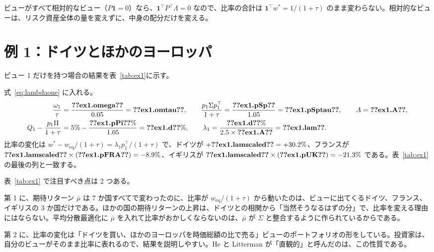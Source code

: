 \documentclass[xelatex,ja=standard,jafont=hiragino-pron,a4paper,11pt,openany]{bxjsreport}
\makeatletter
\newcommand{\V}[1]{\ifcsname v@#1\endcsname\csname v@#1\endcsname\else\textbf{??#1??}\fi}
\newcommand{\tabin}[1]{\adjustbox{max width=\linewidth}{}}
\newcommand{\T}{^{\top}}
\newcommand{\weq}{w_{\mathrm{eq}}}
\newcommand{\mub}{\bar{\mu}}
\newcommand{\one}{\mathbf{1}}
\newcommand{\tabref}[1]{表~\ref{#1}}
\makeatother
\begin{document}
ビューがすべて相対的なビュー（$P\one = 0$）なら、$\one\T P\T\Lambda = 0$ なので、比率の合計は $\one\T w^* = 1/(1 + \tau)$ のまま変わらない。相対的なビューは、リスク資産全体の量を変えずに、中身の配分だけを変える。

\section{例 1：ドイツとほかのヨーロッパ}

ビュー 1 だけを持つ場合の結果を\tabref{tab:ex1}に示す。

\begin{table}[htbp]
\centering
\caption{例 1：ドイツがほかのヨーロッパを 5\% 上回る（年率 \%、$\tau = 0.05$、$\delta = 2.5$）。}
\label{tab:ex1}
\small\tabin{ex1}
\end{table}

\begin{exbox}
式~\eqref{eq:lambdaone} に入れる。
\begin{align*}
\frac{\omega_1}{\tau} &= \frac{\V{ex1.omega}}{0.05} = \V{ex1.omtau}, \qquad
\frac{p_1\Sigma p_1\T}{1 + \tau} = \frac{\V{ex1.pSp}}{1.05} = \V{ex1.pSptau}, \qquad
A = \V{ex1.A}, \\
Q_1 - \frac{p_1\Pi}{1 + \tau} &= 5\% - \frac{\V{ex1.pPi}\%}{1.05} = \V{ex1.d}\%, \qquad
\lambda_1 = \frac{\V{ex1.d}\%}{2.5 \times \V{ex1.A}} = \V{ex1.lam}.
\end{align*}
比率の変化は $w^* - \weq/(1 + \tau) = \lambda_1 p_1\T/(1 + \tau)$ で、ドイツが $+\V{ex1.lamscaled} = +30.2\%$、フランスが $\V{ex1.lamscaled} \times (\V{ex1.pFRA}) = -8.9\%$、イギリスが $\V{ex1.lamscaled} \times (\V{ex1.pUK}) = -21.3\%$ である。\tabref{tab:ex1} の最後の列と一致する。
\end{exbox}

\tabref{tab:ex1} で注目すべき点は 2 つある。

第 1 に、期待リターン $\mub$ は 7 か国すべてで変わったのに、比率が $\weq/(1 + \tau)$ から動いたのは、ビューに出てくるドイツ、フランス、イギリスの 3 か国だけである。ほかの国の期待リターンの上昇は、ドイツとの相関から「当然そうなるはずの分」で、比率を変える理由にはならない。平均分散最適化に $\mub$ を入れて比率がおかしくならないのは、$\mub$ が $\Sigma$ と整合するように作られているからである。

第 2 に、比率の変化は「ドイツを買い、ほかのヨーロッパを時価総額の比で売る」ビューのポートフォリオの形をしている。投資家は、自分のビューがそのまま比率に表れるので、結果を説明しやすい。He と Litterman が「直観的」と呼んだのは、この性質である。
\end{document}
